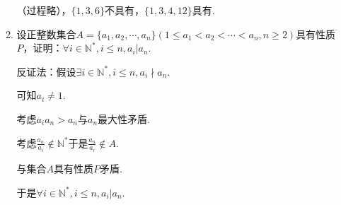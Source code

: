 \documentclass[8pt]{article}
\begin{document}
\begin{enumerate}
\begin{enumerate}[ (1) ]
				（过程略），$\{1,3,6\}$不具有，$\{1,3,4,12\}$具有.

				\item 设正整数集合$A=\{a_1,a_2,\cdots,a_n\}(1\leq a_1 < a_2 < \cdots < a_n, n \geq 2)$具有性质$P$，证明：$\forall i \in \mathbb{N}^{*}, i\leq n, a_i | a_n$.

				反证法：假设$\exists i \in \mathbb{N}^{*}, i\leq n, a_i \nmid a_n$.

				可知$a_i\neq 1$.

				考虑$a_i a_n > a_n$与$a_n$最大性矛盾.

				考虑$\frac{a_n}{a_i}\notin \mathbb{N}^{*}$于是$\frac{a_n}{a_i}\notin A$.

				与集合$A$具有性质$P$矛盾.

				于是$\forall i \in \mathbb{N}^{*}, i\leq n, a_i | a_n$.

			\end{enumerate}

	\end{enumerate}
\end{document}
